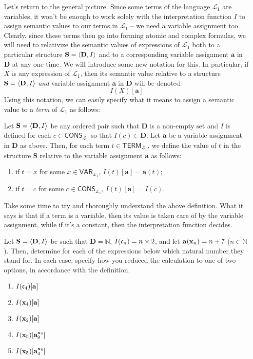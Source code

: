 Let's return to the general picture. Since some terms of the language $\mathcal{L}_1$ are variables, it won't be enough to work solely with the interpretation function $I$ to assign semantic values to our terms in $\mathcal{L}_1$ -- we need a variable assignment too. Clearly, since these terms then go into forming atomic and complex formulas, we will need to relativize the semantic values of expressions of $\mathcal{L}_1$ both to a particular structure $\mathbf{S}=\langle\mathbf{D}, I\rangle$ and to a corresponding variable assignment $\mathbf{a}$ in $\mathbf{D}$ at any one time. We will introduce some new notation for this. In particular, if $X$ is any expression of $\mathcal{L}_1$, then its semantic value relative to a structure $\mathbf{S}=\langle\mathbf{D}, I\rangle$ \textit{and} variable assignment $\mathbf{a}$ in $\mathbf{D}$ will be denoted:
\[
I(X)[\mathbf{a}]
\]
Using this notation, we can easily specify what it means to assign a semantic value to a \textit{term} of $\mathcal{L}_1$ as follows:
\begin{defn}
Let $\mathbf{S}=\langle\mathbf{D}, I\rangle$ be any ordered pair such that $\mathbf{D}$ is a non-empty set and $I$ is defined for each $c \in \mathsf{CONS}_{\mathcal{L}_1}$ so that $I(c) \in \mathbf{D}$. Let $\mathbf{a}$ be a variable assignment in $\mathbf{D}$ as above. Then, for each term $t \in \mathsf{TERM}_{\mathcal{L}_1}$, we define the value of $t$ in the structure $\mathbf{S}$ relative to the variable assignment $\mathbf{a}$ as follows:
\begin{enumerate}
	\item if $t=x$ for some $x \in \textsf{VAR}_{\mathcal{L}_1}$, $I(t)[\mathbf{a}]=\mathbf{a}(t)$;
	\item if $t=c$ for some $c \in \textsf{CONS}_{\mathcal{L}_1}$, $I(t)[\mathbf{a}]=I(c)$.
\end{enumerate}
\end{defn}

\begin{remark}
Take some time to try and thoroughly understand the above definition. What it says is that if a term is a variable, then its value is taken care of by the variable assignment, while if it's a constant, then the interpretation function decides. 
\end{remark}

\begin{exc}
Let $\mathbf{S}=\langle\mathbf{D}, I\rangle$ be such that $\mathbf{D}=\mathbb{N}$, $I(\mathfrak{c}_{n})=n \times 2$, and let $\mathbf{a}(\mathbf{x}_{n})= n + 7$ ($n \in \mathbb{N}$). Then, determine for each of the expressions below which natural number they stand for. In each case, specify how you reduced the calculation to one of two options, in accordance with the definition. 
%
\begin{enumerate}
	\item $I(\mathfrak{c}_{4})[\mathbf{a}]$
	\item $I(\mathbf{x}_{4})[\mathbf{a}]$
	\item $I(\mathbf{x}_{2})[\mathbf{a}]$
	\item $I(\mathbf{x}_{5})[\mathbf{a}^{\mathbf{x}_{5}}_9]$
	\item $I(\mathbf{x}_{5})[\mathbf{a}^{\mathbf{x}_{8}}_4]$
\end{enumerate}
\end{exc}

